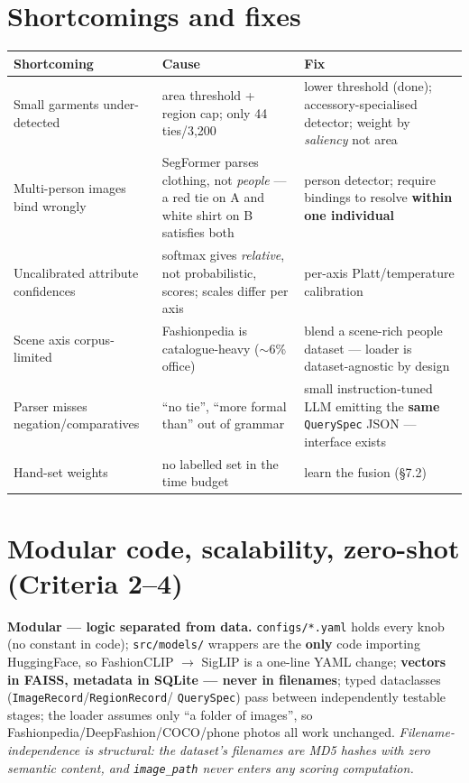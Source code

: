 \documentclass[10pt,a4paper]{article}
\newcommand{\tcode}[1]{\texttt{\small #1}}
\begin{document}
\section{Shortcomings and fixes}

\begin{center}\small
\begin{tabularx}{\textwidth}{@{}>{\raggedright\arraybackslash}p{}XX@{}}
\toprule
\textbf{Shortcoming} & \textbf{Cause} & \textbf{Fix} \\
\midrule
Small garments under-detected & area threshold + region cap; only 44 ties/3{,}200 & lower threshold (done); accessory-specialised detector; weight by \emph{saliency} not area \\
Multi-person images bind wrongly & SegFormer parses clothing, not \emph{people} --- a red tie on A and white shirt on B satisfies both & person detector; require bindings to resolve \textbf{within one individual} \\
Uncalibrated attribute confidences & softmax gives \emph{relative}, not probabilistic, scores; scales differ per axis & per-axis Platt/temperature calibration \\
Scene axis corpus-limited & Fashionpedia is catalogue-heavy ($\sim$6\% office) & blend a scene-rich people dataset --- loader is dataset-agnostic by design \\
Parser misses negation/comparatives & ``no tie'', ``more formal than'' out of grammar & small instruction-tuned LLM emitting the \textbf{same} \tcode{QuerySpec} JSON --- interface exists \\
Hand-set weights & no labelled set in the time budget & learn the fusion (\S7.2) \\
\bottomrule
\end{tabularx}
\end{center}

\section{Modular code, scalability, zero-shot \textnormal{\small(Criteria 2--4)}}

\textbf{Modular --- logic separated from data.} \tcode{configs/*.yaml} holds every knob (no constant
in code); \tcode{src/models/} wrappers are the \textbf{only} code importing HuggingFace, so
FashionCLIP $\rightarrow$ SigLIP is a one-line YAML change; \textbf{vectors in FAISS, metadata in
SQLite --- never in filenames}; typed dataclasses (\tcode{ImageRecord}/\tcode{RegionRecord}/%
\tcode{QuerySpec}) pass between independently testable stages; the loader assumes only ``a folder of
images'', so Fashionpedia/DeepFashion/COCO/phone photos all work unchanged. \emph{Filename-%
independence is structural: the dataset's filenames are MD5 hashes with zero semantic content, and
\tcode{image\_path} never enters any scoring computation.}
\end{document}
